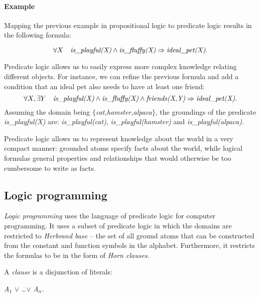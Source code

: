\paragraph{Example} Mapping the previous example in propositional logic to predicate logic results in the following formula:

$$\forall X \quad \text{\textit{is\_playful(X)}} \wedge \text{\textit{is\_fluffy(X)}} \Rightarrow \text{\textit{ideal\_pet(X)}}. $$

 Predicate logic allows us to easily express more complex knowledge relating different objects.
 For instance, we can refine the previous formula and add a condition that an ideal pet also needs to have at least one friend:
 $$\forall X, \exists Y \quad \text{\textit{is\_playful(X)}} \wedge \text{\textit{is\_fluffy(X)}} \wedge \text{\textit{friends(X,Y)}} \Rightarrow \text{\textit{ideal\_pet(X)}}. $$
 Assuming the domain being $\{$\textit{cat,hamster,alpaca}$\}$, the groundings of the predicate \textit{is\_playful(X)} are: \textit{is\_playful(cat)}, \textit{is\_playful(hamster)} and \textit{is\_playful(alpaca)}.




 Predicate logic allows us to represent knowledge about the world in a very compact manner: grounded atoms specify facts about the world, while logical formulas general properties and relationships that would otherwise be too cumbersome to write as facts.










\subsection{Logic programming}


\textit{Logic programming} uses the language of predicate logic for computer programming.
It uses a subset of predicate logic in which the domains are restricted to \textit{Herbrand base} -- the set of all ground atoms that can be constructed from the constant and function symbols in the alphabet.
Furthermore, it restricts the formulas to be in the form of \textit{Horn clauses}.


A \textit{clause} is a disjunction of literals:

\begin{center}
	\textit{A}$_1$  $\vee$ \ldots $\vee$ \textit{A}$_n$.
\end{center}


